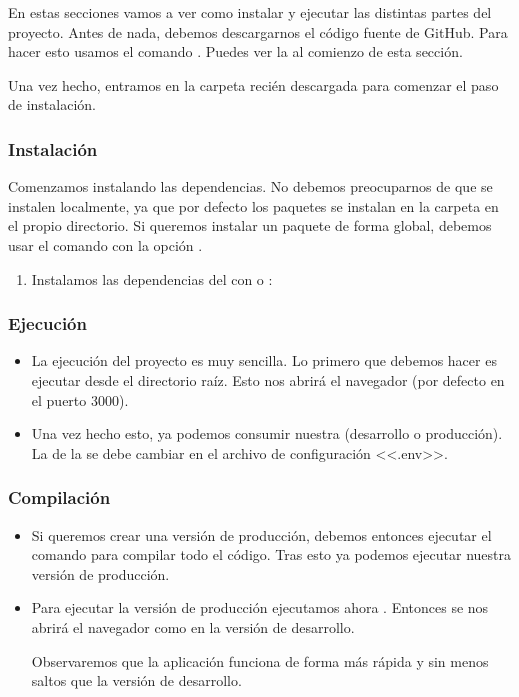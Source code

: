 En estas secciones vamos a ver como instalar y ejecutar las distintas partes del proyecto. Antes de nada, debemos descargarnos el código fuente de GitHub. Para hacer esto usamos el comando . Puedes ver la  al comienzo de esta sección.

Una vez hecho, entramos en la carpeta recién descargada para comenzar el paso de instalación.

\subsubsection{Instalación}

Comenzamos instalando las dependencias. No debemos preocuparnos de que se instalen localmente, ya que por defecto los paquetes se instalan en la carpeta  en el propio directorio. Si queremos instalar un paquete de forma global, debemos usar el comando  con la opción .

\begin{enumerate}
  \item Instalamos las dependencias del  con  o :
\end{enumerate}

\subsubsection{Ejecución}

\begin{itemize}
  \item La ejecución del proyecto es muy sencilla. Lo primero que debemos hacer es ejecutar  desde el directorio raíz. Esto nos abrirá el navegador (por defecto en el puerto 3000).

  \item Una vez hecho esto, ya podemos consumir nuestra  (desarrollo o producción). La  de la  se debe cambiar en el archivo de configuración <<.env>>.
\end{itemize}

\subsubsection{Compilación}

\begin{itemize}
  \item Si queremos crear una versión de producción, debemos entonces ejecutar el comando  para compilar todo el código. Tras esto ya podemos ejecutar nuestra versión de producción.

  \item Para ejecutar la versión de producción ejecutamos ahora . Entonces se nos abrirá el navegador como en la versión de desarrollo.

        Observaremos que la aplicación funciona de forma más rápida y sin menos saltos que la versión de desarrollo.
\end{itemize}

